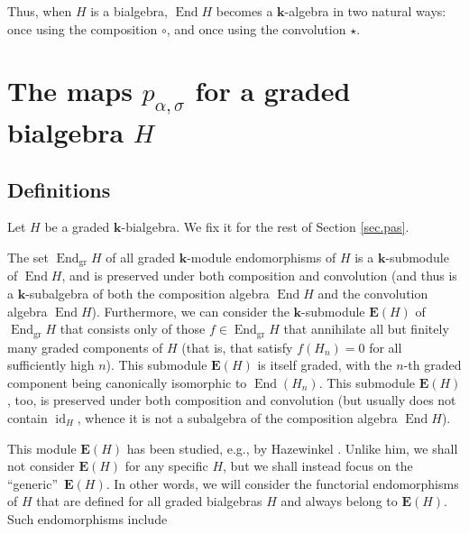 \documentclass[numbers=enddot,12pt,final,onecolumn,notitlepage]{scrartcl}%
\theoremstyle{definition}
\begin{document}
Thus, when $H$ is a bialgebra, $\operatorname*{End}H$ becomes a $\mathbf{k}%
$-algebra in two natural ways: once using the composition $\circ$, and once
using the convolution $\star$.

\section{\label{sec.pas}The maps $p_{\alpha,\sigma}$ for a graded bialgebra
$H$}

\subsection{Definitions}

Let $H$ be a graded $\mathbf{k}$-bialgebra. We fix it for the rest of Section
\ref{sec.pas}.

The set $\operatorname*{End}\nolimits_{\operatorname*{gr}}H$ of all graded
$\mathbf{k}$-module endomorphisms of $H$ is a $\mathbf{k}$-submodule of
$\operatorname*{End}H$, and is preserved under both composition and
convolution (and thus is a $\mathbf{k}$-subalgebra of both the composition
algebra $\operatorname*{End}H$ and the convolution algebra
$\operatorname*{End}H$). Furthermore, we can consider the $\mathbf{k}%
$-submodule $\mathbf{E}\left(  H\right)  $ of $\operatorname*{End}%
\nolimits_{\operatorname*{gr}}H$ that consists only of those $f\in
\operatorname*{End}\nolimits_{\operatorname*{gr}}H$ that annihilate all but
finitely many graded components of $H$ (that is, that satisfy $f\left(
H_{n}\right)  =0$ for all sufficiently high $n$). This submodule
$\mathbf{E}\left(  H\right)  $ is itself graded, with the $n$-th graded
component being canonically isomorphic to $\operatorname*{End}\left(
H_{n}\right)  $. This submodule $\mathbf{E}\left(  H\right)  $, too, is
preserved under both composition and convolution (but usually does not contain
$\operatorname*{id}\nolimits_{H}$, whence it is not a subalgebra of the
composition algebra $\operatorname*{End}H$).

This module $\mathbf{E}\left(  H\right)  $ has been studied, e.g., by
Hazewinkel \cite{Hazewi04}. Unlike him, we shall not consider $\mathbf{E}%
\left(  H\right)  $ for any specific $H$, but we shall instead focus on the
\textquotedblleft generic\textquotedblright\ $\mathbf{E}\left(  H\right)  $.
In other words, we will consider the functorial endomorphisms of $H$ that are
defined for all graded bialgebras $H$ and always belong to $\mathbf{E}\left(
H\right)  $. Such endomorphisms include
\end{document}

